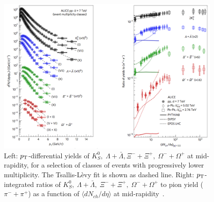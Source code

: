\begin{figure}[!ht]
  \centering
  \includegraphics[width=14cm]{FigCap1/StrangenessALICEpp.png}
  \caption{Left: $p_{\rm T}$-differential yields of $K^0_S,\; \Lambda + \bar{\Lambda}, \Xi^- + \Xi^+,\; \Omega^- + \Omega^+$ at mid-rapidity, for a selection of classes of events with progressively lower multiplicity. The Tsallis-Lèvy fit is shown as dashed line. Right: $p_{\rm T}$-integrated ratios of $K^0_S,\; \Lambda + \bar{\Lambda},\; \Xi^- + \Xi^+,\; \Omega^- + \Omega^+$ to pion yield ($\pi^- + \pi^+$) as a function of $\langle dN_{ch}/d\eta \rangle$ at mid-rapidity~\cite{ALICE:2017jyt}.}
  \label{fig:StrangenessALICEpp}
\end{figure}













